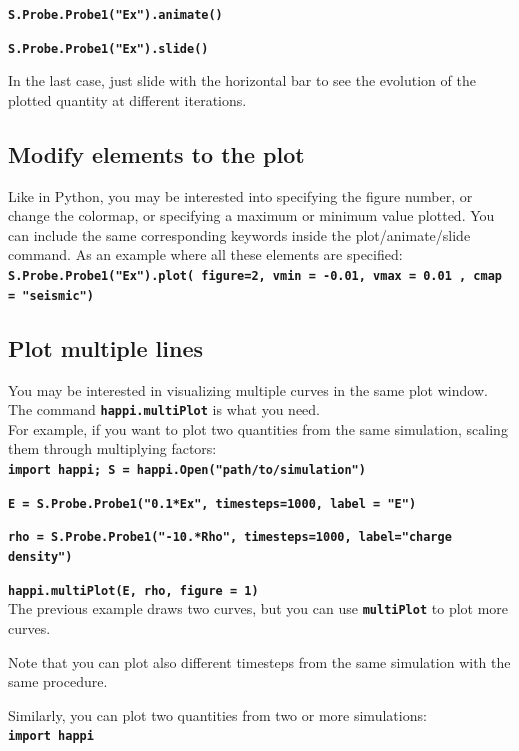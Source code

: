 \documentclass[a4paper,12pt]{extarticle}
\newcommand{\commandline}[1]{\texttt{\textbf{#1}}}
\begin{document}
\begin{appendices}
\commandline{S.Probe.Probe1("Ex").animate()}

\commandline{S.Probe.Probe1("Ex").slide()}

In the last case, just slide with the horizontal bar to see the evolution of the plotted quantity at different iterations.

\subsection*{Modify elements to the plot}
Like in Python, you may be interested into specifying the figure number, or change the colormap, or specifying a maximum or minimum value plotted. You can include the same corresponding keywords inside the plot/animate/slide command. As an example where all these elements are specified:\\

\commandline{S.Probe.Probe1("Ex").plot( figure=2, vmin = -0.01, vmax  = 0.01 , cmap = "seismic")}

\subsection*{Plot multiple lines}
You may be interested in visualizing multiple curves in the same plot window. The command \commandline{happi.multiPlot} is what you need.\\

For example, if you want to plot two quantities from the same simulation, scaling them through multiplying factors:\\

\commandline{import happi; S =  happi.Open("path/to/simulation")}

\commandline{E = S.Probe.Probe1("0.1*Ex", timesteps=1000, label = "E")}

\commandline{rho = S.Probe.Probe1("-10.*Rho", timesteps=1000, label="charge density")}

\commandline{happi.multiPlot(E, rho, figure = 1)}\\

The previous example draws two  curves, but you can use \commandline{multiPlot} to plot more curves.

Note that you can plot also different timesteps from the same simulation with the same procedure. 

Similarly, you can plot two quantities from two or more  simulations:\\

\commandline{import happi}


\end{appendices}
\end{document}
